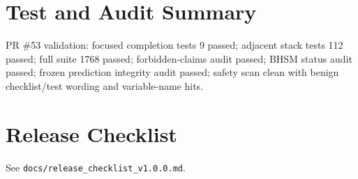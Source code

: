 \documentclass[11pt]{article}
\begin{document}
\section{Test and Audit Summary}
PR \#53 validation: focused completion tests 9 passed; adjacent stack tests 112 passed; full suite 1768 passed; forbidden-claims audit passed; BHSM status audit passed; frozen prediction integrity audit passed; safety scan clean with benign checklist/test wording and variable-name hits.

\section{Release Checklist}
See \texttt{docs/release\_checklist\_v1.0.0.md}.
\end{document}
